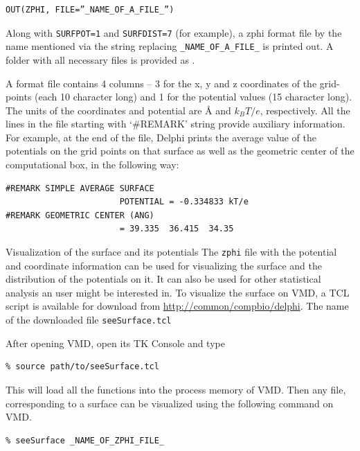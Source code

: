 \documentclass[9pt,tutorial]{livecoms}
\newcommand*\ttvar[1]{\texttt{\expandafter\dottvar\detokenize{#1}\relax}}
\newcommand*\dottvar[1]{\ifx\relax#1\else
  \expandafter\ifx\string_#1\string_\allowbreak\else#1\fi
  \expandafter\dottvar\fi}
\begin{document}
\begin{verbatim}
OUT(ZPHI, FILE=”_NAME_OF_A_FILE_”)
\end{verbatim}

Along with \texttt{SURFPOT=1} and \texttt{SURFDIST=7} (for example), a zphi format file by the name mentioned via the string replacing \texttt{\_NAME\_OF\_A\_FILE\_} is printed out. A folder with all necessary files is provided as \ttvar{Example_3.1.3/}. 

A  format file contains 4 columns – 3 for the x, y and z coordinates of the grid-points (each 10 character long) and 1 for the potential values (15 character long). The units of the coordinates and potential are Å and $ k_BT/e $, respectively. All the lines in the file starting with ‘#REMARK’ string provide auxiliary information. For example, at the end of the file, Delphi prints the average value of the potentials on the grid points on that surface as well as the geometric center of the computational box, in the following way:

\begin{verbatim}
#REMARK SIMPLE AVERAGE SURFACE 
                       POTENTIAL = -0.334833 kT/e
#REMARK GEOMETRIC CENTER (ANG)          
                       = 39.335  36.415  34.35
\end{verbatim}

Visualization of the surface and its potentials
The \texttt{zphi} file with the potential and coordinate information can be used for visualizing the surface and the distribution of the potentials on it. It can also be used for other statistical analysis an user might be interested in. To visualize the surface on VMD\cite{humphrey1996vmd}, a TCL script is available for download from \url{http://common/compbio/delphi}. The name of the downloaded file \texttt{seeSurface.tcl}

After opening VMD, open its TK Console and type

\begin{verbatim}
% source path/to/seeSurface.tcl
\end{verbatim}

This will load all the functions into the process memory of VMD\cite{humphrey1996vmd}. Then any file, corresponding to a surface can be visualized using the following command on VMD.

\begin{verbatim}
% seeSurface _NAME_OF_ZPHI_FILE_
\end{verbatim}
\end{document}
